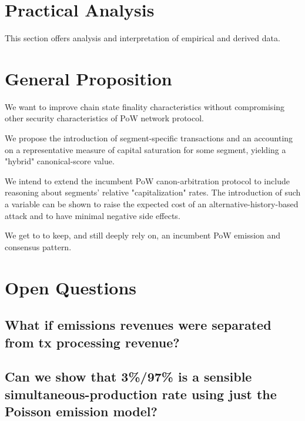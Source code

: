 \documentclass[11pt]{article}
\theoremstyle{plain}
\begin{document}
{\section{\normalsize{Practical Analysis}}

This section offers analysis and interpretation of empirical and derived data.

\pagebreak
\section{\normalsize{General Proposition}}

We want to improve chain state finality characteristics without compromising
other security characteristics of PoW network protocol.

We propose the introduction of segment-specific transactions and an accounting
on a representative measure of capital saturation for some segment, yielding a
"hybrid" canonical-score value.

We intend to extend the incumbent PoW canon-arbitration protocol to include
reasoning about segments' relative "capitalization" rates.
The introduction of such a variable can be shown to raise the expected cost of
an alternative-history-based attack and to have minimal negative side effects.

We get to to keep, and still deeply rely on, an incumbent PoW emission and
consensus pattern.





\section{\normalsize{Open Questions}}

\subsection{\small{What if emissions revenues were separated from tx processing
revenue?}}


\subsection{\small{Can we show that 3\%/97\% is a sensible
simultaneous-production rate using just the Poisson emission
model?}}

}
\end{document}
